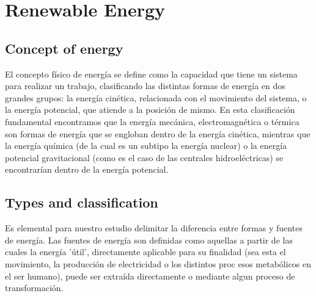 \section{Renewable Energy}

\subsection{Concept of energy}
El concepto físico de energía se define como la capacidad que tiene un sistema para realizar un trabajo, clasificando las distintas formas de energía en dos grandes grupos: la energía cinética, relacionada con el movimiento del sistema, o la energía potencial, que atiende a la posición de mismo. En esta clasificación fundamental encontramos que la energía mecánica, electromagnética o térmica son formas de energía que se engloban dentro de la energía cinética, mientras que la energía química (de la cual es un subtipo la energía nuclear) o la energía potencial gravitacional (como es el caso de las centrales hidroeléctricas) se encontrarían dentro de la energía potencial.


\subsection{Types and classification}
Es elemental para nuestro estudio delimitar la diferencia entre formas y fuentes de energía. Las fuentes de energía son definidas como aquellas a partir de las cuales la energía 'útil', directamente aplicable para su finalidad (sea esta el movimiento, la producción de electricidad o los distintos proc
esos metabólicos en el ser humano), puede ser extraída directamente o mediante algun proceso de transformación.


